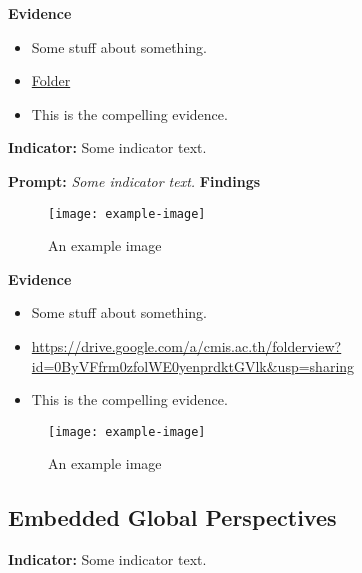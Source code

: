 \documentclass{report}
\begin{document}
\noindent\textbf{Evidence}
\vspace{-\topsep}

\begin{itemize}[leftmargin=*]
\setlength{\parskip}{0pt}
\setlength{\itemsep}{0pt plus 1pt}
\item Some stuff about something.
\item \href{https://drive.google.com/a/cmis.ac.th/folderview?id=0ByVFfrm0zfolWE0yenprdktGVlk&usp=sharing}{Folder}
\item This is the compelling evidence.
\end{itemize}

\noindent\textbf{Indicator:} Some indicator text.

\noindent\textbf{Prompt:} \textit{Some indicator text.}
\noindent\textbf{Findings}

\blindtext

\blinditemize[6]

\blindtext

\begin{figure}[h!]
\caption[An example image]{An example image}
\centering
\texttt{[image: example-image]}
\end{figure}


\noindent\textbf{Evidence}
\vspace{-\topsep}

\begin{itemize}[leftmargin=*]
\setlength{\parskip}{0pt}
\setlength{\itemsep}{0pt plus 1pt}
\item Some stuff about something.
\item \url{https://drive.google.com/a/cmis.ac.th/folderview?id=0ByVFfrm0zfolWE0yenprdktGVlk&usp=sharing}
\item This is the compelling evidence.
\end{itemize}

\begin{figure}[h!]
\caption[An example image]{An example image}
\centering
\texttt{[image: example-image]}
\end{figure}


\subsection{Embedded Global Perspectives}
\blindtext

\blindtext
 
\noindent\textbf{Indicator:} Some indicator text.
\end{document}
